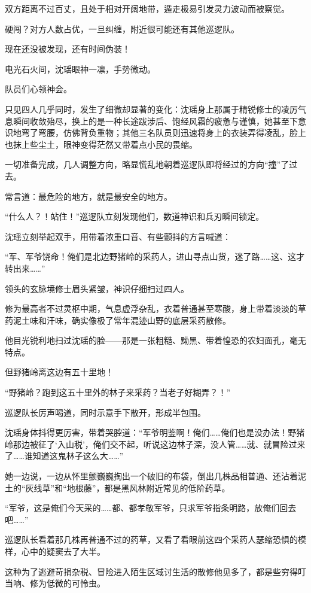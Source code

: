 双方距离不过百丈，且处于相对开阔地带，遁走极易引发灵力波动而被察觉。

硬闯？对方人数占优，一旦纠缠，附近很可能还有其他巡逻队。

现在还没被发现，还有时间伪装！

电光石火间，沈瑶眼神一凛，手势微动。

队员们心领神会。

只见四人几乎同时，发生了细微却显著的变化：沈瑶身上那属于精锐修士的凌厉气息瞬间收敛殆尽，换上的是一种长途跋涉后、饱经风霜的疲惫与谨慎，她甚至下意识地弯了弯腰，仿佛背负重物；其他三名队员则迅速将身上的衣装弄得凌乱，脸上也抹上些尘土，眼神变得茫然又带着点小民的畏缩。

一切准备完成，几人调整方向，略显慌乱地朝着巡逻队即将经过的方向“撞”了过去。

常言道：最危险的地方，就是最安全的地方。

“什么人？！站住！”巡逻队立刻发现他们，数道神识和兵刃瞬间锁定。

沈瑶立刻举起双手，用带着浓重口音、有些颤抖的方言喊道：

“军、军爷饶命！俺们是北边野猪岭的采药人，进山寻点山货，迷了路……这、这才转出来……”

领头的玄脉境修士眉头紧皱，神识仔细扫过四人。

修为最高者不过灵枢中期，气息虚浮杂乱，衣着普通甚至寒酸，身上带着淡淡的草药泥土味和汗味，确实像极了常年混迹山野的底层采药散修。

他目光锐利地扫过沈瑶的脸——那是一张粗糙、黝黑、带着惶恐的农妇面孔，毫无特点。

但野猪岭离这边有五十里地！

“野猪岭？跑到这五十里外的林子来采药？当老子好糊弄？！”

巡逻队长厉声喝道，同时示意手下散开，形成半包围。

沈瑶身体抖得更厉害，带着哭腔道：“军爷明鉴啊！俺们……俺们也是没办法！野猪岭那边被征了‘入山税’，俺们交不起，听说这边林子深，没人管……就、就冒险过来了……谁知道这鬼林子这么大……”

她一边说，一边从怀里颤巍巍掏出一个破旧的布袋，倒出几株品相普通、还沾着泥土的“灰线草”和“地根藤”，都是黑风林附近常见的低阶药草。

“军爷，这是俺们今天采的……都、都孝敬军爷，只求军爷指条明路，放俺们回去吧……”

巡逻队长看着那几株再普通不过的药草，又看了看眼前这四个采药人瑟缩恐惧的模样，心中的疑窦去了大半。

这种为了逃避苛捐杂税、冒险进入陌生区域讨生活的散修他见多了，都是些穷得叮当响、修为低微的可怜虫。

